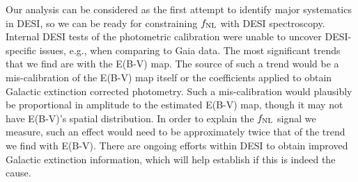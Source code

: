  Our analysis can be considered as the first attempt to identify major systematics in DESI, so we can be ready for constraining $f_{\rm NL}$ with DESI spectroscopy. Internal DESI tests of the photometric calibration were unable to uncover DESI-specific issues, e.g., when comparing to Gaia data. The most significant trends that we find are with the E(B-V) map. The source of such a trend would be a mis-calibration of the E(B-V) map itself or the coefficients applied to obtain Galactic extinction corrected photometry. Such a mis-calibration would plausibly be proportional in amplitude to the estimated E(B-V) map, though it may not have E(B-V)’s spatial distribution. In order to explain the $f_{\rm NL}$ signal we measure, such an effect would need to be approximately twice that of the trend we find with E(B-V). There are ongoing efforts within DESI to obtain improved Galactic extinction information, which will help establish if this is indeed the cause.